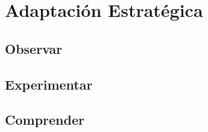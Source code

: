 \chapter*{Adaptación Estratégica}

\section*{Observar}

\section*{Experimentar}

\section*{Comprender}